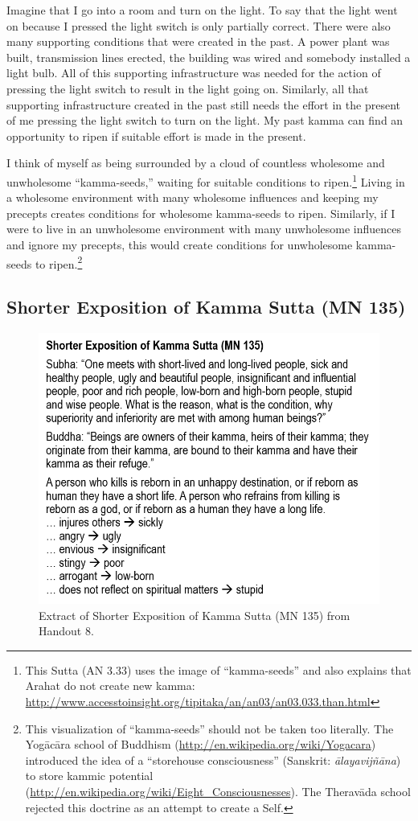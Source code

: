 Imagine that I go into a room and turn on the light. To say that the light went on because I pressed the light switch is only partially correct. There were also many supporting conditions that were created in the past. A power plant was built, transmission lines erected, the building was wired and somebody installed a light bulb. All of this supporting infrastructure was needed for the action of pressing the light switch to result in the light going on. Similarly, all that supporting infrastructure created in the past still needs the effort in the present of me pressing the light switch to turn on the light. My past kamma can find an opportunity to ripen if suitable effort is made in the present.

I think of myself as being surrounded by a cloud of countless wholesome and unwholesome “kamma-seeds,” waiting for suitable conditions to ripen.\footnote{This Sutta (AN 3.33) uses the image of “kamma-seeds” and also explains that Arahat do not create new kamma: \url{http://www.accesstoinsight.org/tipitaka/an/an03/an03.033.than.html}} Living in a wholesome environment with many wholesome influences and keeping my precepts creates conditions for wholesome kamma-seeds to ripen. Similarly, if I were to live in an unwholesome environment with many unwholesome influences and ignore my precepts, this would create conditions for unwholesome kamma-seeds to ripen.\footnote{This visualization of “kamma-seeds” should not be taken too literally. The Yogācāra school of Buddhism (\url{http://en.wikipedia.org/wiki/Yogacara}) introduced the idea of a “storehouse consciousness” (Sanskrit: \textit{ālayavijñāna}) to store kammic potential (\url{http://en.wikipedia.org/wiki/Eight_Consciousnesses}). The Theravāda school rejected this doctrine as an attempt to create a Self.}

\subsection*{Shorter Exposition of Kamma Sutta (MN 135)}

\begin{figure}[h]
\centering
\includegraphics[width=0.7\linewidth]{./Diagrams/MN135}
\caption{Extract of Shorter Exposition of Kamma Sutta (MN 135) from Handout 8.}
\label{fig:MN135}
\end{figure}

